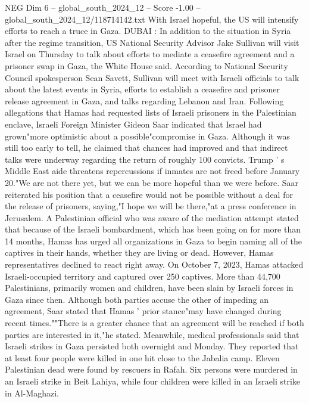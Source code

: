 \begin{textsample}{NEG Dim 6 – global\_south\_2024\_12 – Score -1.00 – global\_south\_2024\_12/118714142.txt}  \label{ex:f6_neg_116}
With Israel hopeful, the US will intensify efforts to reach a truce in Gaza.
DUBAI : In addition to the situation in Syria after the regime transition, US National Security Advisor Jake Sullivan will visit Israel on Thursday to talk about efforts to mediate a ceasefire agreement and a prisoner swap in Gaza, the White House said.
According to National Security Council spokesperson Sean Savett, Sullivan will meet with Israeli officials to talk about the latest events in Syria, efforts to establish a ceasefire and prisoner release agreement in Gaza, and talks regarding Lebanon and Iran.
Following allegations that Hamas had requested lists of Israeli prisoners in the Palestinian enclave, Israeli Foreign Minister Gideon Saar indicated that Israel had grown"more optimistic about a possible"compromise in Gaza.
Although it was still too early to tell, he claimed that chances had improved and that indirect talks were underway regarding the return of roughly 100 convicts.
Trump ' s Middle East aide threatens repercussions if inmates are not freed before January 20."We are not there yet, but we can be more hopeful than we were before.
Saar reiterated his position that a ceasefire would not be possible without a deal for the release of prisoners, saying,"I hope we will be there,"at a press conference in Jerusalem.
A Palestinian official who was aware of the mediation attempt stated that because of the Israeli bombardment, which has been going on for more than 14 months, Hamas has urged all organizations in Gaza to begin naming all of the captives in their hands, whether they are living or dead.
However, Hamas representatives declined to react right away.
On October 7, 2023, Hamas attacked Israeli-occupied territory and captured over 250 captives.
More than 44,700 Palestinians, primarily women and children, have been slain by Israeli forces in Gaza since then.
Although both parties accuse the other of impeding an agreement, Saar stated that Hamas ' prior stance"may have changed during recent times.""There is a greater chance that an agreement will be reached if both parties are interested in it,"he stated.
Meanwhile, medical professionals said that Israeli strikes in Gaza persisted both overnight and Monday.
They reported that at least four people were killed in one hit close to the Jabalia camp.
Eleven Palestinian dead were found by rescuers in Rafah.
Six persons were murdered in an Israeli strike in Beit Lahiya, while four children were killed in an Israeli strike in Al-Maghazi.

\end{textsample}
